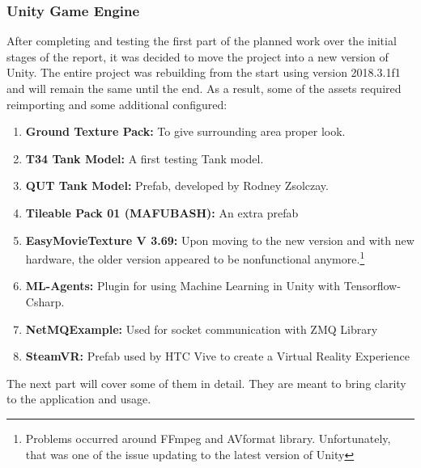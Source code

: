 \subsubsection{Unity Game Engine}
After completing and testing the first part of the planned work over the initial stages of the report, it was decided to move the project into a new version of Unity.
The entire project was rebuilding from the start using version 2018.3.1f1 and will remain the same until the end.
As a result, some of the assets required reimporting and some additional configured:
\begin{enumerate}
    \item \textbf{Ground Texture Pack:} To give surrounding area proper look.
    \item \textbf{T34 Tank Model:} A first testing Tank model.
    \item \textbf{QUT Tank Model:} Prefab, developed by Rodney Zsolczay.
    \item \textbf{Tileable Pack 01 (MAFUBASH):} An extra prefab
    \item \textbf{EasyMovieTexture V 3.69:} Upon moving to the new version and with new hardware, the older version appeared to be nonfunctional anymore.\footnote{Problems occurred around FFmpeg and AVformat library. Unfortunately, that was one of the issue updating to the latest version of Unity}
    \item \textbf{ML-Agents:} Plugin for using Machine Learning in Unity with Tensorflow-Csharp.
    \item \textbf{NetMQExample:} Used for socket communication with ZMQ Library
    \item \textbf{SteamVR:} Prefab used by HTC Vive to create a Virtual Reality Experience
\end{enumerate}
The next part will cover some of them in detail.
They are meant to bring clarity to the application and usage.
